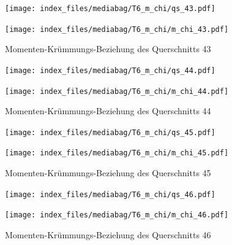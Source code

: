 \documentclass[
  11pt,
  letterpaper,
]{scrreprt}
\begin{document}
\begin{figure}[H]

\begin{minipage}{0.50\linewidth}
\texttt{[image: index\_files/mediabag/T6\_m\_chi/qs\_43.pdf]}\end{minipage}%
%
\begin{minipage}{0.50\linewidth}
\texttt{[image: index\_files/mediabag/T6\_m\_chi/m\_chi\_43.pdf]}\end{minipage}%

\caption{\label{fig-m_chi_appendix}Momenten-Krümmungs-Beziehung des
Querschnitts 43}

\end{figure}%

\begin{figure}[H]

\begin{minipage}{0.50\linewidth}
\texttt{[image: index\_files/mediabag/T6\_m\_chi/qs\_44.pdf]}\end{minipage}%
%
\begin{minipage}{0.50\linewidth}
\texttt{[image: index\_files/mediabag/T6\_m\_chi/m\_chi\_44.pdf]}\end{minipage}%

\caption{\label{fig-m_chi_appendix}Momenten-Krümmungs-Beziehung des
Querschnitts 44}

\end{figure}%

\begin{figure}[H]

\begin{minipage}{0.50\linewidth}
\texttt{[image: index\_files/mediabag/T6\_m\_chi/qs\_45.pdf]}\end{minipage}%
%
\begin{minipage}{0.50\linewidth}
\texttt{[image: index\_files/mediabag/T6\_m\_chi/m\_chi\_45.pdf]}\end{minipage}%

\caption{\label{fig-m_chi_appendix}Momenten-Krümmungs-Beziehung des
Querschnitts 45}

\end{figure}%

\begin{figure}[H]

\begin{minipage}{0.50\linewidth}
\texttt{[image: index\_files/mediabag/T6\_m\_chi/qs\_46.pdf]}\end{minipage}%
%
\begin{minipage}{0.50\linewidth}
\texttt{[image: index\_files/mediabag/T6\_m\_chi/m\_chi\_46.pdf]}\end{minipage}%

\caption{\label{fig-m_chi_appendix}Momenten-Krümmungs-Beziehung des
Querschnitts 46}

\end{figure}%
\end{document}
